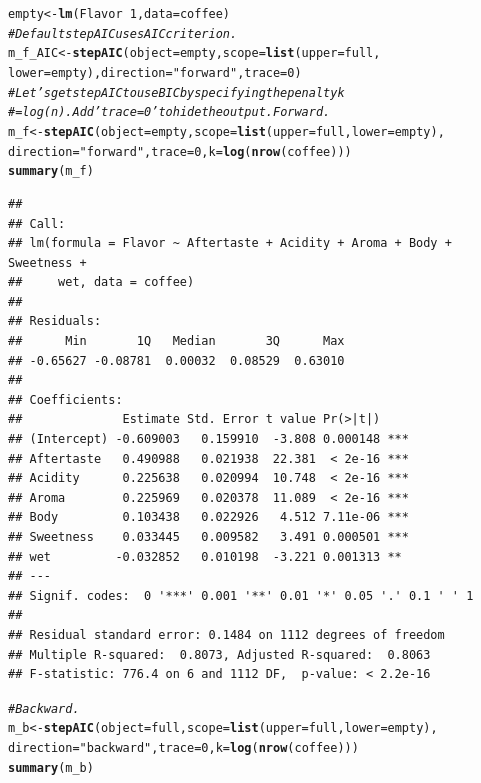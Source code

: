 \documentclass[oneside]{book}\usepackage[]{graphicx}\usepackage[dvipsnames,table,xcdraw]{xcolor}
\makeatletter
\newcommand{\hlnum}[1]{\textcolor[rgb]{0.686,0.059,0.569}{#1}}%
\newcommand{\hlstr}[1]{\textcolor[rgb]{0.192,0.494,0.8}{#1}}%
\newcommand{\hlcom}[1]{\textcolor[rgb]{0.678,0.584,0.686}{\textit{#1}}}%
\newcommand{\hlopt}[1]{\textcolor[rgb]{0,0,0}{#1}}%
\newcommand{\hlstd}[1]{\textcolor[rgb]{0.345,0.345,0.345}{#1}}%
\newcommand{\hlkwb}[1]{\textcolor[rgb]{0.69,0.353,0.396}{#1}}%
\newcommand{\hlkwc}[1]{\textcolor[rgb]{0.333,0.667,0.333}{#1}}%
\newcommand{\hlkwd}[1]{\textcolor[rgb]{0.737,0.353,0.396}{\textbf{#1}}}%
\newenvironment{kframe}{%
 \def\at@end@of@kframe{}%
 \ifinner\ifhmode%
  \def\at@end@of@kframe{\end{minipage}}%
  \begin{minipage}{\columnwidth}%
 \fi\fi%
 \def\FrameCommand##1{\hskip\@totalleftmargin \hskip-\fboxsep
 \colorbox{shadecolor}{##1}\hskip-\fboxsep
     \hskip-\linewidth \hskip-\@totalleftmargin \hskip\columnwidth}%
 \MakeFramed {\advance\hsize-\width
   \@totalleftmargin\z@ \linewidth\hsize
   \@setminipage}}%
 {\par\unskip\endMakeFramed%
 \at@end@of@kframe}
\newenvironment{knitrout}{}{} %
\makeatother
\begin{document}
\begin{knitrout}
\begin{kframe}
\begin{alltt}
\hlstd{empty} \hlkwb{<-} \hlkwd{lm}\hlstd{(Flavor} \hlopt{~} \hlnum{1}\hlstd{,} \hlkwc{data} \hlstd{= coffee)}
\hlcom{# Default stepAIC uses AIC criterion.}
\hlstd{m_f_AIC} \hlkwb{<-} \hlkwd{stepAIC}\hlstd{(}\hlkwc{object} \hlstd{= empty,} \hlkwc{scope} \hlstd{=} \hlkwd{list}\hlstd{(}\hlkwc{upper} \hlstd{= full,}
  \hlkwc{lower} \hlstd{= empty),} \hlkwc{direction} \hlstd{=} \hlstr{"forward"}\hlstd{,} \hlkwc{trace} \hlstd{=} \hlnum{0}\hlstd{)}
\hlcom{# Let's get stepAIC to use BIC by specifying the penalty k}
\hlcom{# = log(n).  Add 'trace = 0' to hide the output.  Forward.}
\hlstd{m_f} \hlkwb{<-} \hlkwd{stepAIC}\hlstd{(}\hlkwc{object} \hlstd{= empty,} \hlkwc{scope} \hlstd{=} \hlkwd{list}\hlstd{(}\hlkwc{upper} \hlstd{= full,} \hlkwc{lower} \hlstd{= empty),}
  \hlkwc{direction} \hlstd{=} \hlstr{"forward"}\hlstd{,} \hlkwc{trace} \hlstd{=} \hlnum{0}\hlstd{,} \hlkwc{k} \hlstd{=} \hlkwd{log}\hlstd{(}\hlkwd{nrow}\hlstd{(coffee)))}
\hlkwd{summary}\hlstd{(m_f)}
\end{alltt}
\begin{verbatim}
## 
## Call:
## lm(formula = Flavor ~ Aftertaste + Acidity + Aroma + Body + Sweetness + 
##     wet, data = coffee)
## 
## Residuals:
##      Min       1Q   Median       3Q      Max 
## -0.65627 -0.08781  0.00032  0.08529  0.63010 
## 
## Coefficients:
##              Estimate Std. Error t value Pr(>|t|)    
## (Intercept) -0.609003   0.159910  -3.808 0.000148 ***
## Aftertaste   0.490988   0.021938  22.381  < 2e-16 ***
## Acidity      0.225638   0.020994  10.748  < 2e-16 ***
## Aroma        0.225969   0.020378  11.089  < 2e-16 ***
## Body         0.103438   0.022926   4.512 7.11e-06 ***
## Sweetness    0.033445   0.009582   3.491 0.000501 ***
## wet         -0.032852   0.010198  -3.221 0.001313 ** 
## ---
## Signif. codes:  0 '***' 0.001 '**' 0.01 '*' 0.05 '.' 0.1 ' ' 1
## 
## Residual standard error: 0.1484 on 1112 degrees of freedom
## Multiple R-squared:  0.8073,	Adjusted R-squared:  0.8063 
## F-statistic: 776.4 on 6 and 1112 DF,  p-value: < 2.2e-16
\end{verbatim}
\begin{alltt}
\hlcom{# Backward.}
\hlstd{m_b} \hlkwb{<-} \hlkwd{stepAIC}\hlstd{(}\hlkwc{object} \hlstd{= full,} \hlkwc{scope} \hlstd{=} \hlkwd{list}\hlstd{(}\hlkwc{upper} \hlstd{= full,} \hlkwc{lower} \hlstd{= empty),}
  \hlkwc{direction} \hlstd{=} \hlstr{"backward"}\hlstd{,} \hlkwc{trace} \hlstd{=} \hlnum{0}\hlstd{,} \hlkwc{k} \hlstd{=} \hlkwd{log}\hlstd{(}\hlkwd{nrow}\hlstd{(coffee)))}
\hlkwd{summary}\hlstd{(m_b)}
\end{alltt}

\end{kframe}
\end{knitrout}
\end{document}
